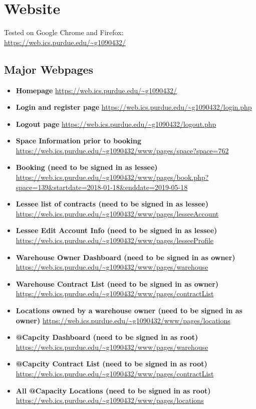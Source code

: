 
\renewcommand{\thepage}{}
\section*{Website}
Tested on Google Chrome and Firefox:\\

\url{https://web.ics.purdue.edu/~g1090432/}
\subsection*{Major Webpages}
\begin{itemize}
\item \textbf{Homepage} \url{https://web.ics.purdue.edu/~g1090432/}
\item \textbf{Login and register page} \url{https://web.ics.purdue.edu/~g1090432/login.php}
\item \textbf{Logout page} \url{https://web.ics.purdue.edu/~g1090432/logout.php}
\item \textbf{Space Information prior to booking} \url{https://web.ics.purdue.edu/~g1090432/www/pages/space?space=762}
\item \textbf{Booking (need to be signed in as lessee)} \url{https://web.ics.purdue.edu/~g1090432/www/pages/book.php?space=139\&startdate=2018-01-18\&enddate=2019-05-18}
\item \textbf{Lessee list of contracts (need to be signed in as lessee)} \url{https://web.ics.purdue.edu/~g1090432/www/pages/lesseeAccount}
\item \textbf{Lessee Edit Account Info (need to be signed in as lessee)} \url{https://web.ics.purdue.edu/~g1090432/www/pages/lesseeProfile}
\item \textbf{Warehouse Owner Dashboard (need to be signed in as owner)} \url{https://web.ics.purdue.edu/~g1090432/www/pages/warehouse}
\item \textbf{Warehouse Contract List (need to be signed in as owner)} \url{https://web.ics.purdue.edu/~g1090432/www/pages/contractList}
\item \textbf{Locations owned by a warehouse owner (need to be signed in as owner)} \url{https://web.ics.purdue.edu/~g1090432/www/pages/locations}
\item \textbf{@Capcity Dashboard (need to be signed in as root)} \url{https://web.ics.purdue.edu/~g1090432/www/pages/warehouse}
\item \textbf{@Capcity Contract List (need to be signed in as root)} \url{https://web.ics.purdue.edu/~g1090432/www/pages/contractList}
\item \textbf{All @Capacity Locations (need to be signed in as root)} \url{https://web.ics.purdue.edu/~g1090432/www/pages/locations}

\end{itemize}
